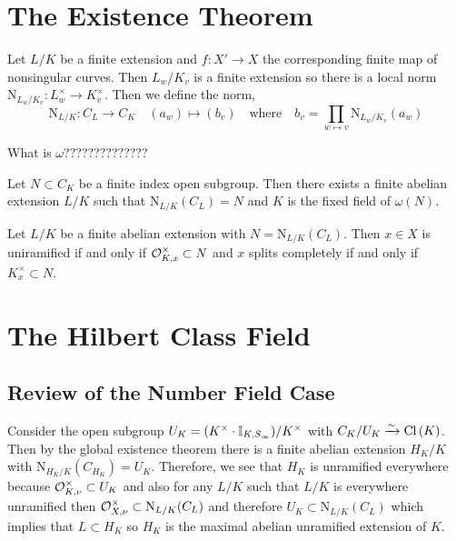 \documentclass[12pt]{article}
\begin{document}
\section{The Existence Theorem}

\newcommand{\Nm}{\mathrm{N}}

\begin{defn}
Let $L/K$ be a finite extension and $f : X' \to X$ the corresponding finite map of nonsingular curves. Then $L_{w} / K_{v}$ is a finite extension so there is a local norm $\Nm_{L_{w}/K_{v}} : L_{w}^\times \to K_{v}^\times$. Then we define the norm,
\[ \Nm_{L/K} : C_L \to C_K \quad (a_w) \mapsto (b_v) \quad \text{where} \quad b_v = \prod_{w \mapsto v} \Nm_{L_{w}/K_{v}}(a_w) \]
\end{defn}

\begin{defn}
What is $\omega$??????????????
\end{defn}

\begin{thm}
Let $N \subset C_K$ be a finite index open subgroup. Then there exists a finite abelian extension $L/K$ such that $\Nm_{L/K}(C_L) = N$ and $K$ is the fixed field of $\omega(N)$.
\end{thm}

\begin{thm}
Let $L/K$ be a finite abelian extension with $N = \Nm_{L/K}(C_L)$. Then $x \in X$ is uniramified if and only if $\mathcal{O}_{K, x}^\times \subset N$ and $x$ splits completely if and only if $K_x^\times \subset N$.
\end{thm}

\section{The Hilbert Class Field}

\subsection{Review of the Number Field Case}

Consider the open subgroup $U_K = (K^\times \cdot \mathbb{I}_{K, S_\infty})/K^\times$ with $C_K / U_K \xrightarrow{\sim} \mathrm{Cl} \left( K \right)$. Then by the global existence theorem there is a finite abelian extension $H_K / K$ with $\Nm_{H_K/K}(C_{H_K}) = U_K$. Therefore, we see that $H_K$ is unramified everywhere because $\mathcal{O}_{K, \nu}^\times \subset U_K$ and also for any $L / K$ such that $L/K$ is everywhere unramified then $\stalk{X}{\nu}^\times \subset \Nm_{L/K}(C_L)$ and therefore $U_K \subset \Nm_{L/K}(C_L)$ which implies that $L \subset H_K$ so $H_K$ is the maximal abelian unramified extension of $K$. 
\end{document}
